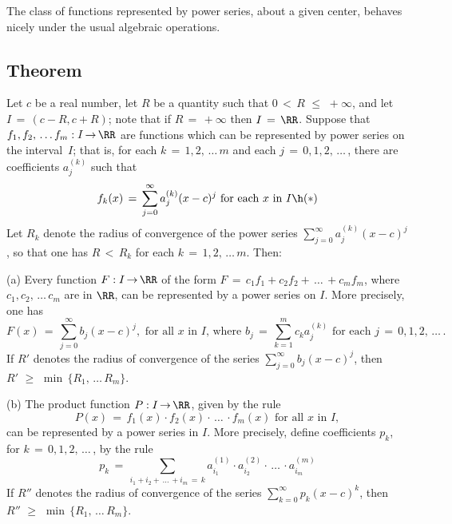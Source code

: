 \V
\V

        The class of functions represented by power series, about a given center, behaves nicely under the usual algebraic operations.

\V

        \subsection{\small{{\bf Theorem}}}
        \label{ThmG60.90}

\V

        Let $c$ be a real number, let $R$ be a quantity such that $0\,<\,R\,\,{\leq}\,\,+{\infty}$,
    and let $I \,=\, (c-R,c+R)$; note that if $R \,=\, +{\infty}$ then $I \,=\, {\RR}$.
    Suppose that $f_{1}, f_{2},\,{\ldots}\,f_{m}:I \,{\rightarrow}\, {\RR}$ are functions which can be represented by power series on the interval~$I$;
    that is, for each $k \,=\, 1,2,\,{\ldots}\,m$ and each $j \,=\, 0,1,2,\,{\ldots}\,$, there are coefficients $a_{j}^{(k)}$ such that
        \begin{displaymath}
        f_{k}(x) \,=\, \sum_{j=0}^{{\infty}} a_{j}^{(k)}(x-c)^{j} \mbox{ for each $x$ in $I$} \h ({\ast})
        \end{displaymath}
    Let $R_{k}$ denote the radius of convergence of the power series $\sum_{j=0}^{{\infty}} a_{j}^{(k)}(x-c)^{j}$,
    so that one has $R\,<\,R_{k}$ for each $k \,=\, 1,2,\,{\ldots}\,m$.
    Then:

\V

        (a) Every function $F:I \,{\rightarrow}\, {\RR}$ of the form $F \,=\, c_{1}f_{1} + c_{2}f_{2} + \,{\ldots}\, + c_{m}f_{m}$,
    where $c_{1},c_{2},\,{\ldots}\,c_{m}$ are in ${\RR}$, can be represented by a power series on $I$.
    More precisely, one has
        \begin{displaymath}
        F(x) \,=\, \sum_{j=0}^{{\infty}} b_{j}(x-c)^{j}, \mbox{ for all $x$ in $I$, where $b_{j} \,=\, \sum_{k=1}^{m} c_{k}a_{j}^{(k)}$ for each $j \,=\, 0,1,2,\,{\ldots}\,$}.
        \end{displaymath}
    If $R'$ denotes the radius of convergence of the series $\sum_{j=0}^{{\infty}} b_{j}(x-c)^{j}$, then $R'\,\,{\geq}\,\,{\min}\,\{R_{1},\,{\ldots}\,R_{m}\}$.

\V

        (b) The product function $P:I \,{\rightarrow}\, {\RR}$, given by the rule
        \begin{displaymath}
        P(x) \,=\, f_{1}(x){\cdot}f_{2}(x){\cdot}\,{\ldots}\,{\cdot}f_{m}(x) \mbox{ for all $x$ in $I$},
        \end{displaymath}
    can be represented by a power series in $I$.
    More precisely, define coefficients $p_{k}$, for $k \,=\, 0,1,2,\,{\ldots}\,$, by the rule
        \begin{equation}
        \label{EqnG.90}
        p_{k} \,=\, \sum_{i_{1} + i_{2} + \,{\ldots}\, + i_{m} \,=\, k} a_{i_{1}}^{(1)}{\cdot}a_{i_{2}}^{(2)}{\cdot}\,{\ldots}\,{\cdot}a_{i_{m}}^{(m)}
        \end{equation}
    If $R''$ denotes the radius of convergence of the series $\sum_{k=0}^{{\infty}} p_{k}(x-c)^{k}$, then $R''\,\,{\geq}\,\,{\min}\,\{R_{1},\,{\ldots}\,R_{m}\}$.

